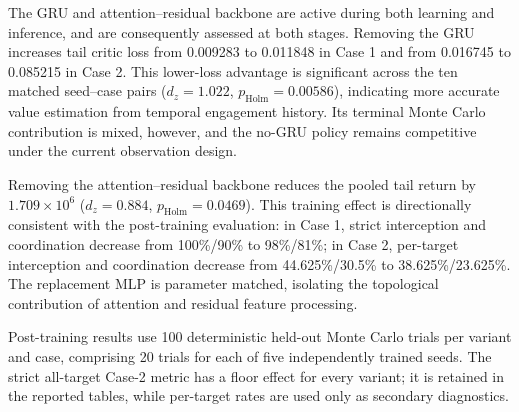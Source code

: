 The GRU and attention--residual backbone are active during both learning and
inference, and are consequently assessed at both stages. Removing the GRU
increases tail critic loss from 0.009283 to 0.011848 in Case 1 and from
0.016745 to 0.085215 in Case 2. This lower-loss advantage is significant
across the ten matched seed--case pairs ($d_z=1.022$,
$p_{\mathrm{Holm}}=0.00586$), indicating more accurate value estimation from
temporal engagement history. Its terminal Monte Carlo contribution is mixed,
however, and the no-GRU policy remains competitive under the current
observation design.

Removing the attention--residual backbone reduces the pooled tail return by
$1.709\times10^6$ ($d_z=0.884$,
$p_{\mathrm{Holm}}=0.0469$). This training effect is directionally consistent
with the post-training evaluation: in Case 1, strict interception and
coordination decrease from 100\%/90\% to 98\%/81\%; in Case 2, per-target
interception and coordination decrease from 44.625\%/30.5\% to
38.625\%/23.625\%. The replacement MLP is parameter matched, isolating the
topological contribution of attention and residual feature processing.

Post-training results use 100 deterministic held-out Monte Carlo trials per
variant and case, comprising 20 trials for each of five independently trained
seeds. The strict all-target Case-2 metric has a floor effect for every
variant; it is retained in the reported tables, while per-target rates are
used only as secondary diagnostics.
